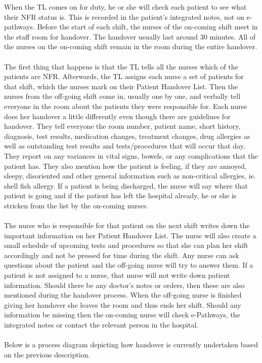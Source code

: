 \newpage
When the TL comes on for duty, he or she will check each patient to see what their NFR status is. This is recorded in the patient's integrated notes, not on e-pathways. Before the start of each shift, the nurses of the on-coming shift meet in the staff room for handover. The handover usually last around 30 minutes. All of the nurses on the on-coming shift remain in the room during the entire handover. 
\\ \\ 
The first thing that happens is that the TL tells all the nurses which of the patients are NFR. Afterwards, the TL assigns each nurse a set of patients for that shift, which the nurses mark on their Patient Handover List. Then the nurses from the off-going shift come in, usually one by one, and verbally tell everyone in the room about the patients they were responsible for. Each nurse does her handover a little differently even though there are guidelines for handover. They tell everyone the room number, patient name, short history, diagnosis, test results, medication changes, treatment changes, drug allergies as well as outstanding test results and tests/procedures that will occur that day. They report on any variances in vital signs, bowels, or any complications that the patient has. They also mention how the patient is feeling, if they are annoyed, sleepy, disoriented and other general information such as non-critical allergies, ie. shell fish allergy. If a patient is being discharged, the nurse will say where that patient is going and if the patient has left the hospital already, he or she is stricken from the list by the on-coming nurses. 
\\ \\
The nurse who is responsible for that patient on the next shift writes down the important information on her Patient Handover List. The nurse will also create a small schedule of upcoming tests and procedures so that she can plan her shift accordingly and not be pressed for time during the shift. Any nurse can ask questions about the patient and the off-going nurse will try to answer them. If a patient is not assigned to a nurse, that nurse will not write down patient information. Should there be any doctor's notes or orders, then these are also mentioned during the handover process. When the off-going nurse is finished giving her handover she leaves the room and thus ends her shift. Should any information be missing then the on-coming nurse will check e-Pathways, the integrated notes or contact the relevant person in the hospital.
\\ \\
Below is a process diagram depicting how handover is currently undertaken based on the previous description.

